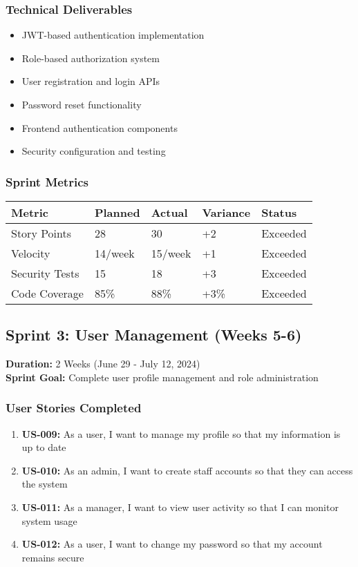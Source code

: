 \documentclass[12pt,a4paper]{article}
\begin{document}
\subsubsection{Technical Deliverables}
\begin{itemize}
    \item JWT-based authentication implementation
    \item Role-based authorization system
    \item User registration and login APIs
    \item Password reset functionality
    \item Frontend authentication components
    \item Security configuration and testing
\end{itemize}

\subsubsection{Sprint Metrics}
\begin{longtable}{|p{3cm}|p{2cm}|p{2cm}|p{2cm}|p{3cm}|}
\hline
\textbf{Metric} & \textbf{Planned} & \textbf{Actual} & \textbf{Variance} & \textbf{Status} \\
\hline
Story Points & 28 & 30 & +2 & \cellcolor{completedgreen}Exceeded \\
\hline
Velocity & 14/week & 15/week & +1 & \cellcolor{completedgreen}Exceeded \\
\hline
Security Tests & 15 & 18 & +3 & \cellcolor{completedgreen}Exceeded \\
\hline
Code Coverage & 85\% & 88\% & +3\% & \cellcolor{completedgreen}Exceeded \\
\hline
\end{longtable}

\subsection{Sprint 3: User Management (Weeks 5-6)}
\textbf{Duration:} 2 Weeks (June 29 - July 12, 2024) \\
\textbf{Sprint Goal:} Complete user profile management and role administration

\subsubsection{User Stories Completed}
\begin{enumerate}
    \item \textbf{US-009:} As a user, I want to manage my profile so that my information is up to date
    \item \textbf{US-010:} As an admin, I want to create staff accounts so that they can access the system
    \item \textbf{US-011:} As a manager, I want to view user activity so that I can monitor system usage
    \item \textbf{US-012:} As a user, I want to change my password so that my account remains secure
\end{enumerate}
\end{document}

